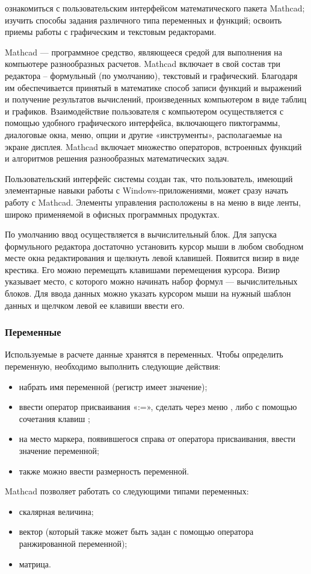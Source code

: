 
\goal ознакомиться с пользовательским интерфейсом математического пакета Mathcad; изучить способы задания различного типа переменных и функций; освоить приемы работы с графическим и текстовым редакторами.

Mathcad --- программное средство, являющееся средой для выполнения на компьютере разнообразных расчетов. Mathcad включает в свой состав три редактора – формульный (по умолчанию), текстовый и графический. Благодаря им обеспечивается принятый в математике способ записи функций и выражений и получение результатов вычислений, произведенных компьютером в виде таблиц и графиков. Взаимодействие пользователя с компьютером осуществляется с помощью удобного графического интерфейса, включающего пиктограммы, диалоговые окна, меню, опции и другие «инструменты», располагаемые на экране дисплея. Mathcad включает множество операторов, встроенных функций и алгоритмов решения разнообразных математических задач.

Пользовательский интерфейс системы создан так, что пользователь, имеющий элементарные навыки работы с Windows-приложениями, может сразу начать работу с Mathcad. Элементы управления расположены в на меню в виде ленты, широко применяемой в офисных программных продуктах.

По умолчанию ввод осуществляется в вычислительный блок. Для запуска формульного редактора достаточно установить курсор мыши в любом свободном месте окна редактирования и щелкнуть левой клавишей. Появится визир в виде крестика. Его можно перемещать клавишами перемещения курсора. Визир указывает место, с которого можно начинать набор формул --- вычислительных блоков. Для ввода данных можно указать курсором мыши на нужный шаблон данных и щелчком левой ее клавиши ввести его.



\subsubsection*{Переменные}
Используемые в расчете данные хранятся в переменных. Чтобы определить переменную, необходимо выполнить следующие действия:
\begin{itemize}
	\item набрать имя переменной (регистр имеет значение);
	\item ввести оператор присваивания «:=», сделать через меню  ,  либо с помощью сочетания клавиш \keys{\shift+:};
	\item на место маркера, появившегося справа от оператора присваивания, ввести значение переменной;
	\item также можно ввести размерность переменной.
\end{itemize}
Mathcad позволяет работать со следующими типами переменных:
\begin{itemize}
\item скалярная величина;
\item вектор (который также может быть задан с помощью оператора ранжированной переменной);
\item матрица.
\end{itemize}

